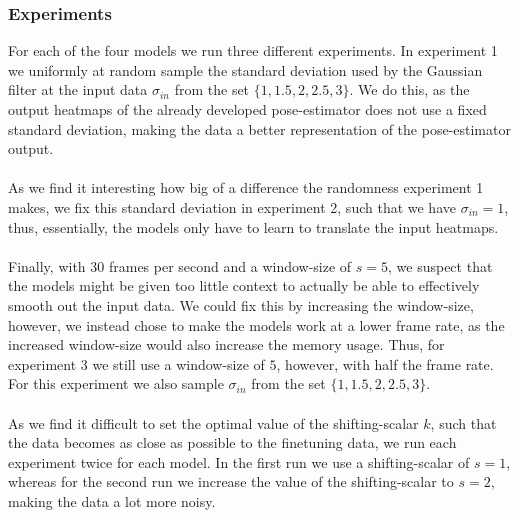 \documentclass[./main.tex]{subfiles}
\begin{document}
\subsubsection{Experiments} For each of the four models we run three different experiments. In experiment 1 we uniformly at random sample the standard deviation used by the Gaussian filter at the input data $\sigma_{in}$ from the set $\{1, 1.5, 2, 2.5, 3\}$. We do this, as the output heatmaps of the already developed pose-estimator does not use a fixed standard deviation, making the data a better representation of the pose-estimator output. 
\\
\\
As we find it interesting how big of a difference the randomness experiment 1 makes, we fix this standard deviation in experiment 2, such that we have $\sigma_{in} = 1$, thus, essentially, the models only have to learn to translate the input heatmaps.
\\
\\
Finally, with $30$ frames per second and a window-size of $s = 5$, we suspect that the models might be given too little context to actually be able to effectively smooth out the input data. We could fix this by increasing the window-size, however, we instead chose to make the models work at a lower frame rate, as the increased window-size would also increase the memory usage. Thus, for experiment 3 we still use a window-size of $5$, however, with half the frame rate. For this experiment we also sample $\sigma_{in}$ from the set $\{1, 1.5, 2, 2.5, 3\}$.
\\
\\
As we find it difficult to set the optimal value of the shifting-scalar $k$, such that the data becomes as close as possible to the finetuning data, we run each experiment twice for each model. In the first run we use a shifting-scalar of $s = 1$, whereas for the second run we increase the value of the shifting-scalar to $s = 2$, making the data a lot more noisy.
\end{document}
